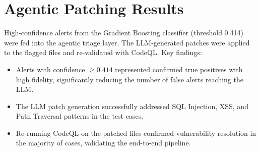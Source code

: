 \section{Agentic Patching Results}

High-confidence alerts from the Gradient Boosting classifier (threshold 0.414) were fed
into the agentic triage layer. The LLM-generated patches were applied to the flagged
files and re-validated with CodeQL. Key findings:

\begin{itemize}
  \item Alerts with confidence $\geq 0.414$ represented confirmed true positives with
        high fidelity, significantly reducing the number of false alerts reaching the LLM.
  \item The LLM patch generation successfully addressed SQL Injection, XSS, and Path
        Traversal patterns in the test cases.
  \item Re-running CodeQL on the patched files confirmed vulnerability resolution in
        the majority of cases, validating the end-to-end pipeline.
\end{itemize}
